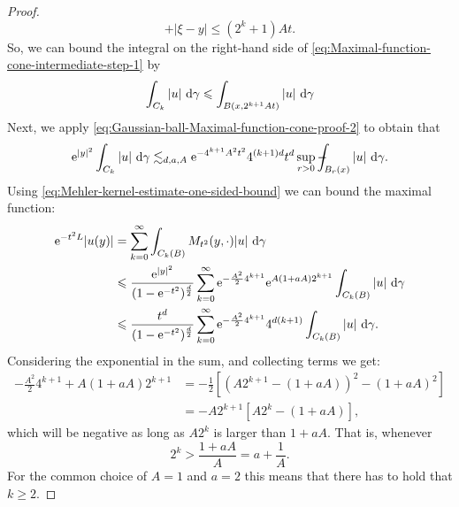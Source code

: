 \documentclass[a4paper,oneside,10pt]{amsproc}
\theoremstyle{plain}
\theoremstyle{remark}
\theoremstyle{definition}
\newcommand{\D}{\,\textup{d}}
\def\Xint#1{\mathchoice
  {\XXint\displaystyle\textstyle{#1}}%
  {\XXint\textstyle\scriptstyle{#1}}%
  {\XXint\scriptstyle\scriptscriptstyle{#1}}%
  {\XXint\scriptscriptstyle\scriptscriptstyle{#1}}%
  \!\int}
\def\XXint#1#2#3{{\setbox0=\hbox{$#1{#2#3}{\int}$ }
    \vcenter{\hbox{$#2#3$ }}\kern-.535\wd0}}
\def\dashint{\Xint-}
\renewcommand{\leq}{\leqslant}
\renewcommand{\leq}{\leqslant}
\renewcommand{\geq}{\geqslant}
\newcommand{\e}{\mathrm{e}} %
\renewcommand{\leq}{\leqslant}%
\renewcommand{\geq}{\geqslant}%
\begin{document}
\begin{proof}
\begin{equation*}
    + |\xi - y| \leq (2^k + 1) A t.
  \end{equation*}
  So, we can bound the integral on the right-hand side of
  \eqref{eq:Maximal-function-cone-intermediate-step-1} by
  \begin{equation*}
    \int_{C_k}  |u| \,\D\gamma \leq \int_{B(x, 2^{k + 1} A t)} |u|
    \,\D\gamma
  \end{equation*}
  Next, we apply
  \eqref{eq:Gaussian-ball-Maximal-function-cone-proof-2} to obtain that
  \begin{equation*}
    \e^{|y|^2} \int_{C_k}  |u| \,\D\gamma \lesssim_{d, a, A} \e^{-4^{k + 1} A^2
      t^2} 4^{(k + 1)d} t^d \sup_{r > 0} \dashint_{B_r(x)} |u| \,
    \D\gamma.
  \end{equation*}
  Using \eqref{eq:Mehler-kernel-estimate-one-sided-bound} we can bound
  the maximal function:
  \begin{equation}
    \label{eq:Maximal-function-cone-intermediate-step-1}
    \begin{split}
      \e^{-t^2 L} |u(y)| &= \sum_{k = 0}^\infty \int_{C_k(B)} M_{t^2}(y,
      \cdot) |u| \,\D\gamma\\
      &\leq \frac{\e^{|y|^2}}{(1 - \e^{-t^2})^{\frac{d}2}} \sum_{k = 0}^\infty
      \e^{-\frac{A^2}2 4^{k + 1}} \e^{A(1 + aA) 2^{k + 1}}
      \int_{C_k(B)}  |u| \,\D\gamma\\
      &\leq \frac{t^d}{(1 - \e^{-t^2})^{\frac{d}2}} \sum_{k = 0}^\infty
      \e^{-\frac{A^2}2 4^{k + 1}} 4^{d(k + 1)}
      \int_{C_k(B)}  |u| \,\D\gamma.
    \end{split}
  \end{equation}
  Considering the exponential in the sum, and collecting terms we get:
  \begin{align*}
    -\frac{A^2}2 4^{k + 1} + A(1 + aA) 2^{k + 1} &= -\frac12 [(A 2^{k +
      1} - (1 + a A))^2 - (1 + aA)^2]\\
    &= -A 2^{k+1} [A 2^k -(1 + a A)],
  \end{align*}
  which will be negative as long as $A 2^k$ is larger than $1 + aA$.
  That is, whenever
  \begin{equation*}
    2^k > \frac{1 + a A}{A} = a + \frac1A.
  \end{equation*}
  For the common choice of $A = 1$ and $a = 2$ this means that there
  has to hold that $k \geq 2$.


\end{proof}
\end{document}
